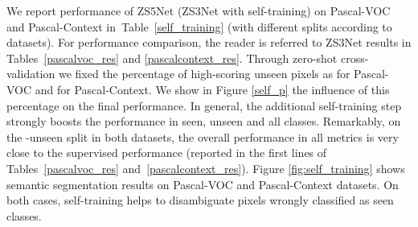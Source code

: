 \documentclass{article}
\begin{document}
We report performance of ZS5Net (ZS3Net with self-training) on Pascal-VOC and Pascal-Context in~Table~\ref{self_training} (with different splits according to datasets).
For performance comparison, the reader is referred to ZS3Net results in Tables~\ref{pascalvoc_res} and \ref{pascalcontext_res}.
Through zero-shot cross-validation we fixed the percentage of high-scoring unseen pixels as  for Pascal-VOC and  for Pascal-Context.
We show in Figure \ref{self_p} the influence of this percentage on the final performance. 
In general, the additional self-training step strongly boosts the performance in seen, unseen and all classes.
Remarkably, on the -unseen split in both datasets, the overall performance in all metrics is very close to the supervised performance (reported in the first lines of Tables~\ref{pascalvoc_res} and~\ref{pascalcontext_res}).
Figure \ref{fig:self_training} shows semantic segmentation results on Pascal-VOC and Pascal-Context datasets. On both cases, self-training helps to disambiguate pixels wrongly classified as seen classes. 
\end{document}
